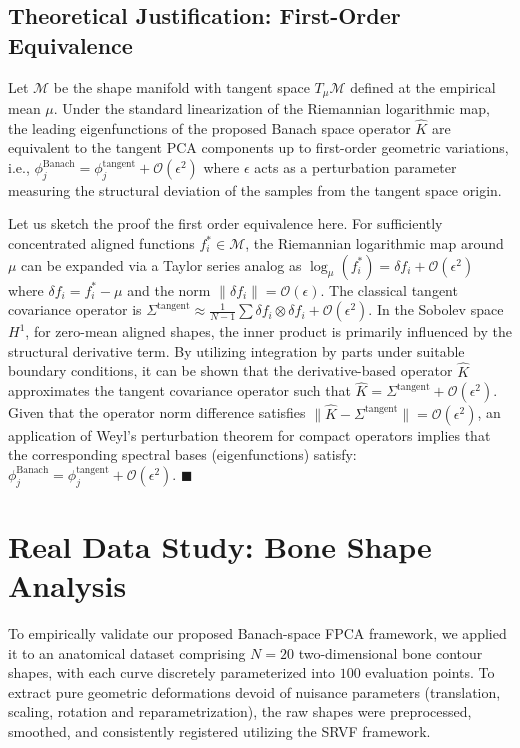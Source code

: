 \documentclass[twoside]{article}
\begin{document}
\subsection{Theoretical Justification: First-Order Equivalence}

\begin{theorem}
Let $\mathcal{M}$ be the shape manifold with tangent space $T_{\mu}\mathcal{M}$ defined at the empirical mean $\mu$. Under the standard linearization of the Riemannian logarithmic map, the leading eigenfunctions of the proposed Banach space operator $\hat{K}$ are equivalent to the tangent PCA components up to first-order geometric variations, i.e.,
$ \phi_j^{\text{Banach}} = \phi_j^{\text{tangent}} + \mathcal{O}(\epsilon^2) $
where $\epsilon$ acts as a perturbation parameter measuring the structural deviation of the samples from the tangent space origin.
\end{theorem}

Let us sketch the proof the first order equivalence here. For sufficiently concentrated aligned functions $f_i^* \in \mathcal{M}$, the Riemannian logarithmic map around $\mu$ can be expanded via a Taylor series analog as $\log_{\mu}(f_i^*) = \delta f_i + \mathcal{O}(\epsilon^2)$ where $\delta f_i = f_i^* - \mu$ and the norm $\|\delta f_i\| = \mathcal{O}(\epsilon)$. The classical tangent covariance operator is $\Sigma^{\text{tangent}} \approx \frac{1}{N-1}\sum \delta f_i \otimes \delta f_i + \mathcal{O}(\epsilon^2)$. In the Sobolev space $H^1$, for zero-mean aligned shapes, the inner product is primarily influenced by the structural derivative term. By utilizing integration by parts under suitable boundary conditions, it can be shown that the derivative-based operator $\hat{K}$ approximates the tangent covariance operator such that $\hat{K} = \Sigma^{\text{tangent}} + \mathcal{O}(\epsilon^2)$. Given that the operator norm difference satisfies $\|\hat{K} - \Sigma^{\text{tangent}}\| = \mathcal{O}(\epsilon^2)$, an application of Weyl's perturbation theorem for compact operators implies that the corresponding spectral bases (eigenfunctions) satisfy:
$
\phi_j^{\text{Banach}} = \phi_j^{\text{tangent}} + \mathcal{O}(\epsilon^2).
$
\hfill $\blacksquare$



\section{Real Data Study: Bone Shape Analysis}

To empirically validate our proposed Banach-space FPCA framework, we applied it to an anatomical dataset comprising $N=20$ two-dimensional bone contour shapes, with each curve discretely parameterized into $100$ evaluation points. To extract pure geometric deformations devoid of nuisance parameters (translation, scaling, rotation and reparametrization), the raw shapes were preprocessed, smoothed, and consistently registered utilizing the SRVF framework.
\end{document}
